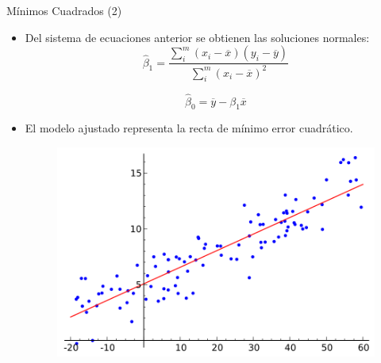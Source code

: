 \documentclass[handout]{beamer}
\begin{document}
\begin{frame}{Mínimos Cuadrados (2)}
\scriptsize{
\begin{itemize}
 \item Del sistema de ecuaciones anterior se obtienen las soluciones normales:
  \begin{equation}
 \hat{\beta}_{1} = \frac{\sum_{i}^{m} (x_i-\overline{x})(y_i-\overline{y}) }{ \sum_{i}^{m} (x_i-\overline{x})^2}    
 \end{equation}

 \begin{equation}
 \hat{\beta}_{0} = \overline{y} -\beta_{1}\overline{x}    
 \end{equation}



\item El modelo ajustado representa la recta de mínimo error cuadrático.

\begin{figure}[h!]
	\centering
	\includegraphics[scale=0.35]{pics/Linear_regression.png}
\end{figure}

\end{itemize}

} 
 
\end{frame}
\end{document}
